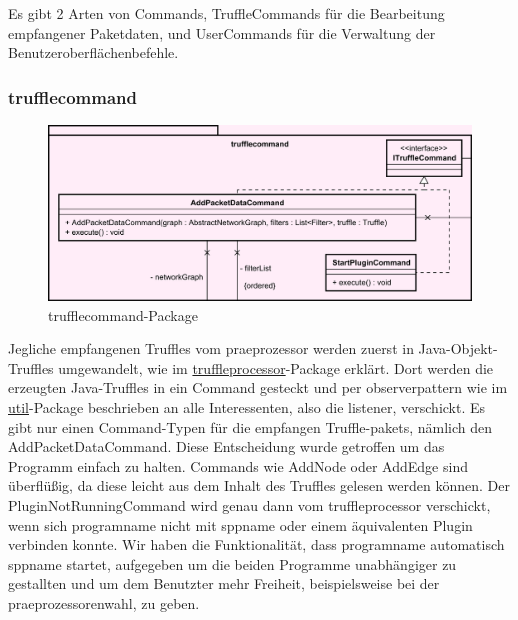Es gibt 2 Arten von Commands, TruffleCommands für die Bearbeitung empfangener
Paketdaten, und UserCommands für die Verwaltung der Benutzeroberflächenbefehle.

      \subsubsection{trufflecommand}
      \label{subsubsec:trufflecommand}

      \begin{figure}[H]
        \centering
        \includegraphics[width=\textwidth]{../diagramimages/trufflecommand.png}
        \caption{trufflecommand-Package}
      \end{figure}

      \medskip
      Jegliche empfangenen Truffles vom \gls{praeprozessor} werden zuerst in Java-Objekt-Truffles umgewandelt, wie
      im \hyperref[subsubsec:truffleprocessor]{truffleprocessor}-Package erklärt. Dort
      werden die erzeugten Java-Truffles in ein Command gesteckt und per \gls{observerpattern}
      wie im \hyperref[subsec:util]{util}-Package beschrieben an alle Interessenten, also die \gls{listener}, verschickt.
      \newline
      \newline
      Es gibt nur einen Command-Typen für die empfangen Truffle-\glspl{paket}, nämlich den
      AddPacketDataCommand. Diese Entscheidung wurde getroffen um das Programm einfach
      zu halten. Commands wie AddNode oder AddEdge sind überflüßig, da diese leicht aus
      dem Inhalt des Truffles gelesen werden können.
      \newline
      \newline
      Der PluginNotRunningCommand wird genau dann vom truffleprocessor verschickt, wenn sich \gls{programname}
      nicht mit \gls{sppname} oder einem äquivalenten Plugin verbinden konnte. Wir
      haben die Funktionalität, dass \gls{programname} automatisch \gls{sppname} startet,
      aufgegeben um die beiden Programme unabhängiger zu gestallten und um dem Benutzter
      mehr Freiheit, beispielsweise bei der \gls{praeprozessor}enwahl, zu geben.

